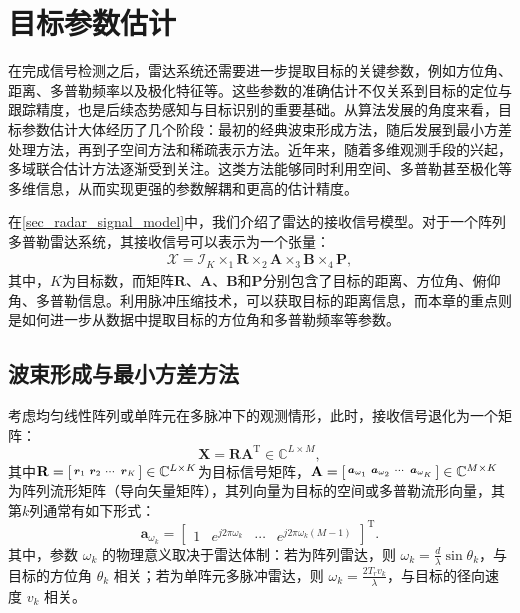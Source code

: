 \chapter{目标参数估计}

在完成信号检测之后，雷达系统还需要进一步提取目标的关键参数，例如方位角、距离、多普勒频率以及极化特征等。这些参数的准确估计不仅关系到目标的定位与跟踪精度，也是后续态势感知与目标识别的重要基础。从算法发展的角度来看，目标参数估计大体经历了几个阶段：最初的经典波束形成方法，随后发展到最小方差处理方法，再到子空间方法和稀疏表示方法。近年来，随着多维观测手段的兴起，多域联合估计方法逐渐受到关注。这类方法能够同时利用空间、多普勒甚至极化等多维信息，从而实现更强的参数解耦和更高的估计精度。

在\cref{sec_radar_signal_model}中，我们介绍了雷达的接收信号模型。对于一个阵列多普勒雷达系统，其接收信号可以表示为一个张量：
\[
    \begin{split}
        \mathcal{X} = \mathcal{I}_K \times_1 \mathbf{R} \times_2 \mathbf{A} \times_3 \mathbf{B} \times_4 \mathbf{P},
    \end{split}
\]
其中，\( K \)为目标数，而矩阵\( \mathbf{R} \)、\( \mathbf{A} \)、\( \mathbf{B} \)和\( \mathbf{P} \)分别包含了目标的距离、方位角、俯仰角、多普勒信息。利用脉冲压缩技术，可以获取目标的距离信息，而本章的重点则是如何进一步从数据中提取目标的方位角和多普勒频率等参数。

\section{波束形成与最小方差方法}
考虑均匀线性阵列或单阵元在多脉冲下的观测情形，此时，接收信号退化为一个矩阵：
\[
    \mathbf{X} = \mathbf{R} \mathbf{A}^{\mathrm{T}} \in \mathbb{C}^{L \times M},
\]
其中\( \mathbf{R} = \begin{bsmallmatrix} \boldsymbol{r}_1 & \boldsymbol{r}_2 & \cdots & \boldsymbol{r}_K \end{bsmallmatrix} \in \mathbb{C}^{L \times K} \)为目标信号矩阵，\( \mathbf{A} = \begin{bsmallmatrix} \boldsymbol{a}_{\omega_1} & \boldsymbol{a}_{\omega_2} & \cdots & \boldsymbol{a}_{\omega_K} \end{bsmallmatrix} \in \mathbb{C}^{M \times K} \)为阵列流形矩阵（导向矢量矩阵），其列向量为目标的空间或多普勒流形向量，其第\( k \)列通常有如下形式：
\[
    \bm{a}_{\omega_k} = \begin{bmatrix}
        1 & e^{j 2 \pi \omega_k} & \cdots & e^{j 2 \pi \omega_k (M-1)}
    \end{bmatrix}^{\mathrm{T}}.
\]
其中，参数 $\omega_k$ 的物理意义取决于雷达体制：若为阵列雷达，则 $\omega_k = \tfrac{d}{\lambda}\sin \theta_k$，与目标的方位角 $\theta_k$ 相关；若为单阵元多脉冲雷达，则 $\omega_k = \tfrac{2 T_r v_k}{\lambda}$，与目标的径向速度 $v_k$ 相关。


